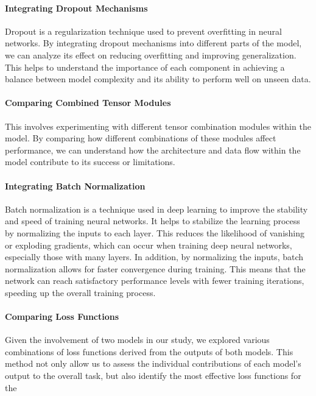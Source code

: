 \paragraph*{Integrating Dropout Mechanisms}
\label{par:4_integrating_dropout_mechanisms} 
Dropout is a regularization technique used to prevent overfitting in neural networks. By integrating dropout mechanisms into different parts of the model, we can analyze its effect on reducing overfitting and improving generalization. This helps to understand the importance of each component in achieving a balance between model complexity and its ability to perform well on unseen data.

\paragraph*{Comparing Combined Tensor Modules}
\label{par:4_comparing_combined_tensor_modules}
This involves experimenting with different tensor combination modules within the model. By comparing how different combinations of these modules affect performance, we can understand how the architecture and data flow within the model contribute to its success or limitations.

\paragraph*{Integrating Batch Normalization}
\label{par:4_integrating_batch_normalization}
Batch normalization is a technique used in deep learning to improve the stability and speed of training neural networks. It helps to stabilize the learning process by normalizing the inputs to each layer. This reduces the likelihood of vanishing or exploding gradients, which can occur when training deep neural networks, especially those with many layers. In addition, by normalizing the inputs, batch normalization allows for faster convergence during training. This means that the network can reach satisfactory performance levels with fewer training iterations, speeding up the overall training process. 

\paragraph*{Comparing Loss Functions}
\label{par:4_comparing_loss_functions}
Given the involvement of two models in our study, we explored various combinations of loss functions derived from the outputs of both models. This method not only allow us to assess the individual contributions of each model's output to the overall task, but also identify the most effective loss functions for the 

